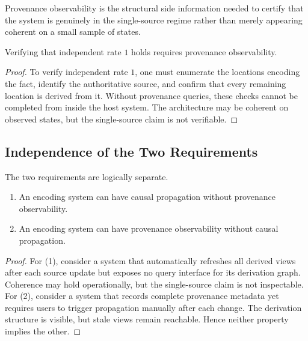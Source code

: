 Provenance observability is the structural side information needed to certify that the system is genuinely in the single-source regime rather than merely appearing coherent on a small sample of states.

\begin{theorem}\label{thm:provenance-necessary}
Verifying that independent rate $1$ holds requires provenance observability.
\end{theorem}

\begin{proof}
To verify independent rate $1$, one must enumerate the locations encoding the fact, identify the authoritative source, and confirm that every remaining location is derived from it. Without provenance queries, these checks cannot be completed from inside the host system. The architecture may be coherent on observed states, but the single-source claim is not verifiable.
\end{proof}

\subsection{Independence of the Two Requirements}\label{sec:independence}

The two requirements are logically separate.

\begin{theorem}\label{thm:independence}
\begin{enumerate}
\tightlist
\item An encoding system can have causal propagation without provenance observability.
\item An encoding system can have provenance observability without causal propagation.
\end{enumerate}
\end{theorem}

\begin{proof}
For (1), consider a system that automatically refreshes all derived views after each source update but exposes no query interface for its derivation graph. Coherence may hold operationally, but the single-source claim is not inspectable. For (2), consider a system that records complete provenance metadata yet requires users to trigger propagation manually after each change. The derivation structure is visible, but stale views remain reachable. Hence neither property implies the other.
\end{proof}


